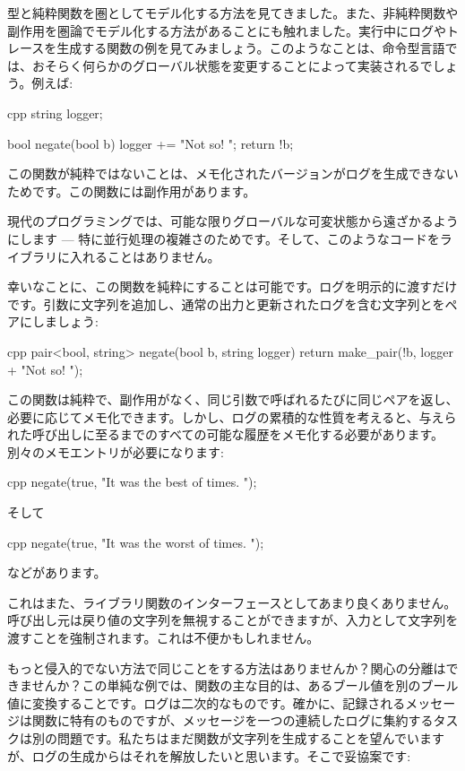 
\lettrine[lhang=0.17]{型}{と}純粋関数を圏としてモデル化する方法を見てきました。また、非純粋関数や副作用を圏論でモデル化する方法があることにも触れました。実行中にログやトレースを生成する関数の例を見てみましょう。このようなことは、命令型言語では、おそらく何らかのグローバル状態を変更することによって実装されるでしょう。例えば:

\begin{snip}{cpp}
string logger;

bool negate(bool b) {
    logger += "Not so! ";
    return !b;
}
\end{snip}
この関数が純粋ではないことは、メモ化されたバージョンがログを生成できないためです。この関数には副作用があります。

現代のプログラミングでは、可能な限りグローバルな可変状態から遠ざかるようにします --- 特に並行処理の複雑さのためです。そして、このようなコードをライブラリに入れることはありません。

幸いなことに、この関数を純粋にすることは可能です。ログを明示的に渡すだけです。引数に文字列を追加し、通常の出力と更新されたログを含む文字列とをペアにしましょう:

\begin{snip}{cpp}
pair<bool, string> negate(bool b, string logger) {
    return make_pair(!b, logger + "Not so! ");
}
\end{snip}
この関数は純粋で、副作用がなく、同じ引数で呼ばれるたびに同じペアを返し、必要に応じてメモ化できます。しかし、ログの累積的な性質を考えると、与えられた呼び出しに至るまでのすべての可能な履歴をメモ化する必要があります。別々のメモエントリが必要になります:

\begin{snip}{cpp}
negate(true, "It was the best of times. ");
\end{snip}
そして

\begin{snip}{cpp}
negate(true, "It was the worst of times. ");
\end{snip}
などがあります。

これはまた、ライブラリ関数のインターフェースとしてあまり良くありません。呼び出し元は戻り値の文字列を無視することができますが、入力として文字列を渡すことを強制されます。これは不便かもしれません。

もっと侵入的でない方法で同じことをする方法はありませんか？関心の分離はできませんか？この単純な例では、関数の主な目的は、あるブール値を別のブール値に変換することです。ログは二次的なものです。確かに、記録されるメッセージは関数に特有のものですが、メッセージを一つの連続したログに集約するタスクは別の問題です。私たちはまだ関数が文字列を生成することを望んでいますが、ログの生成からはそれを解放したいと思います。そこで妥協案です:

